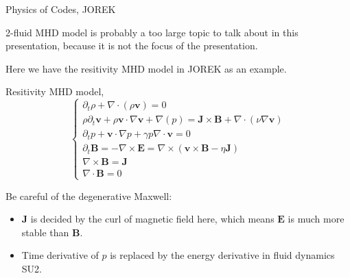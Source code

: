 \begin{frame}{Physics of Codes, JOREK}

2-fluid MHD model is probably a too large topic to talk about in this presentation, because it is not the focus of the presentation.

Here we have the resitivity MHD model in JOREK as an example.

\alert{Resitivity MHD model},
\begin{equation}
\left\{
\begin{array}{l}
{\partial_{t} \rho+\nabla \cdot(\rho \boldsymbol{v})=0} \\ 
{\rho \partial_{t} \boldsymbol{v}+\rho \boldsymbol{v} \cdot \nabla \boldsymbol{v}+\nabla(p)=\boldsymbol{J} \times \boldsymbol{B}+\nabla \cdot(\nu \nabla \boldsymbol{v})} \\ 
{\partial_{t} p+\boldsymbol{v} \cdot \nabla p+\gamma p \nabla \cdot \boldsymbol{v}=0} \\ {\partial_{t} \boldsymbol{B}=-\nabla \times \boldsymbol{E}=\nabla \times(\boldsymbol{v} \times \boldsymbol{B}-\eta \boldsymbol{J})} \\ {\nabla \times \boldsymbol{B}=\boldsymbol{J}} \\ {\nabla \cdot \boldsymbol{B}=0}\end{array}\right.
\end{equation}

Be careful of the degenerative Maxwell:
\begin{itemize}
    \item $\boldsymbol{J}$ is decided by the curl of magnetic field here, which means $\boldsymbol{E}$ is much more stable than $\boldsymbol{B}$.
    \item Time derivative of $p$ is replaced by the energy derivative in fluid dynamics SU2. 
\end{itemize}


\end{frame}


